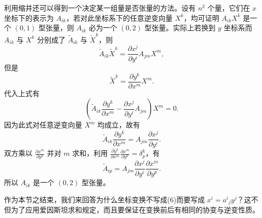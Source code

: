 利用缩并还可以得到一个决定某一组量是否张量的方法。设有 $n^2$ 个量，它们在 $x$ 坐标下的表示为 $A_{ik}$，若对此坐标系下的任意逆变向量 $X^k$，均可证明 $A_{ik}X^k$ 是一个 $(0,1)$ 型张量，则 $A_{ik}$ 必为一个 $(0,2)$ 型张量。实际上若换到 $y$ 坐标系而 $A_{ik}$ 与 $X^k$ 分别成了 $\widetilde A_{ik}$ 与 $\widetilde X^k$，则
\[
 \widetilde A_{ik}\widetilde X^k
 =\frac{\partial x^j}{\partial y^i}A_{jm}X^m,
\]
但是
\[
 \widetilde X^k=\frac{\partial y^k}{\partial x^m}X^m.
\]
代入上式有
\[
 \left(\widetilde A_{ik}\frac{\partial y^k}{\partial x^m}
 -\frac{\partial x^j}{\partial y^i}A_{jm}\right)X^m=0.
\]
因为此式对任意逆变向量 $X^m$ 均成立，故有
\[
 \widetilde A_{ik}\frac{\partial y^k}{\partial x^m}
 =A_{jm}\frac{\partial x^j}{\partial y^i}.
\]
双方乘以 $\frac{\partial x^m}{\partial y^p}$ 并对 $m$ 求和，利用 $\frac{\partial y^k}{\partial x^m}\frac{\partial x^m}{\partial y^p}=\delta^k_p$，有
\[
 \widetilde A_{ip}
 =A_{jm}\frac{\partial x^j}{\partial y^i}\frac{\partial x^m}{\partial y^p}.
\]
所以 $A_{ik}$ 是一个 $(0,2)$ 型张量。

作为本节之结束，我们来回答为什么坐标变换不写成(6)而要写成 $x^i=a^i{}_j y^j$？这不但为了应用爱因斯坦求和规定，而且要保证在变换前后有相同的协变与逆变性质。
